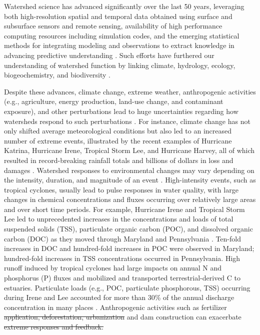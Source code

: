 \documentclass[preprint,review, 12pt]{elsarticle}
\providecommand{\DIFadd}[1]{{\protect\color{blue}\uwave{#1}}} %
\providecommand{\DIFdel}[1]{{\protect\color{red}\sout{#1}}}                      %
\providecommand{\DIFaddbegin}{} %
\providecommand{\DIFaddend}{} %
\providecommand{\DIFdelbegin}{} %
\providecommand{\DIFdelend}{} %
\newcommand{\DIFscaledelfig}{0.5}
\newlength{\DIFdelgraphicswidth} %
\newlength{\DIFdelgraphicsheight} %
\newcommand{\DIFaddincludegraphics}[2][]{{\color{blue}\fbox{\DIFOincludegraphics[#1]{#2}}}} %
\newcommand{\DIFdelincludegraphics}[2][]{%
\sbox{\DIFdelgraphicsbox}{\DIFOincludegraphics[#1]{#2}}%
\settoboxwidth{\DIFdelgraphicswidth}{\DIFdelgraphicsbox} %
\settoboxtotalheight{\DIFdelgraphicsheight}{\DIFdelgraphicsbox} %
\scalebox{\DIFscaledelfig}{%
\parbox[b]{\DIFdelgraphicswidth}{\usebox{\DIFdelgraphicsbox}\\[-\baselineskip] \rule{\DIFdelgraphicswidth}{0em}}\llap{\resizebox{\DIFdelgraphicswidth}{\DIFdelgraphicsheight}{%
\setlength{\unitlength}{\DIFdelgraphicswidth}%
\begin{picture}(1,1)%
\thicklines\linethickness{2pt} %
{\color[rgb]{1,0,0}\put(0,0){\framebox(1,1){}}}%
{\color[rgb]{1,0,0}\put(0,0){\line( 1,1){1}}}%
{\color[rgb]{1,0,0}\put(0,1){\line(1,-1){1}}}%
\end{picture}%
}\hspace*{3pt}}} %
} %
\DeclareRobustCommand{\DIFaddbegin}{\DIFOaddbegin \let\includegraphics\DIFaddincludegraphics} %
\DeclareRobustCommand{\DIFaddend}{\DIFOaddend \let\includegraphics\DIFOincludegraphics} %
\DeclareRobustCommand{\DIFdelbegin}{\DIFOdelbegin \let\includegraphics\DIFdelincludegraphics} %
\DeclareRobustCommand{\DIFdelend}{\DIFOaddend \let\includegraphics\DIFOincludegraphics} %
\begin{document}
Watershed science has advanced significantly over the last 50 years, leveraging both high-resolution spatial and temporal data obtained using surface and subsurface sensors and remote sensing, availability of high performance computing resources including simulation codes, and the emerging statistical methods for integrating modeling and observations to extract knowledge in advancing predictive understanding \citep{kirchner2006getting, wagener2007catchment, kirchner2004fine, Hubbard2018, gooseff2007relating, Beven2006a, bear2013dynamics}. Such efforts have furthered our understanding of watershed function by linking climate, hydrology, ecology, biogeochemistry, and biodiversity \citep{Graham2019}.

Despite these advances, climate change, extreme weather, anthropogenic activities (e.g., agriculture, energy production, land-use change, and contaminant exposure), and other perturbations lead to huge uncertainties regarding how watersheds respond to such perturbations \citep{Page2012}. For instance, climate change has not only shifted average meteorological conditions but also led to an increased number of extreme events, illustrated by the recent examples of Hurricane Katrina, Hurricane Irene, Tropical Storm Lee, and Hurricane Harvey, all of which resulted in record-breaking rainfall totals and billions of dollars in loss and damages \citep{Vidon2018, Paerl2018b}. Watershed responses to environmental changes may vary depending on the intensity, duration, and magnitude of an event \citep{Kaushal2018g}. High-intensity events, such as tropical cyclones, usually lead to pulse responses in water quality, with large changes in chemical concentrations and fluxes occurring over relatively large areas and over short time periods. For example, Hurricane Irene and Tropical Storm Lee led to unprecedented increases in the concentrations and loads of total suspended solids (TSS), particulate organic carbon (POC), and dissolved organic carbon (DOC) as they moved through Maryland and Pennsylvania \citep{Vidon2018}. Ten-fold increases in DOC and hundred-fold increases in POC were observed in Maryland; hundred-fold increases in TSS concentrations occurred in Pennsylvania. High runoff induced by tropical cyclones had large impacts on annual N and phosphorus (P) fluxes and mobilized and transported terrestrial-derived C to estuaries. Particulate loads (e.g., POC, particulate phosphorous, TSS) occurring during Irene and Lee accounted for more than 30\% of the annual discharge concentration in many places \citep{Paerl2018b}. Anthropogenic activities such as fertilizer \DIFdelbegin \DIFdel{application, deforestation, urbanization }\DIFdelend \DIFaddbegin \DIFadd{applications }\DIFaddend and dam construction can exacerbate \DIFdelbegin \DIFdel{extreme responses and feedback.
}
\end{document}
